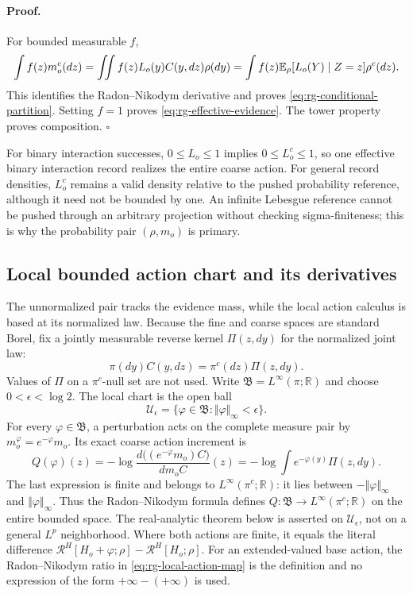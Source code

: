 \paragraph{Proof.}
For bounded measurable $f$,
\[
\int f(z)m_o^c(dz)
=\iint f(z)L_o(y)C(y,dz)\rho(dy)
=\int f(z)\mathbb E_\rho[L_o(Y)\mid Z=z]\rho^c(dz).
\]
This identifies the Radon--Nikodym derivative and proves
\eqref{eq:rg-conditional-partition}.  Setting $f=1$ proves
\eqref{eq:rg-effective-evidence}.  The tower property proves composition.
$\square$

For binary interaction successes, $0\leq L_o\leq1$ implies
$0\leq L_o^c\leq1$, so one effective binary interaction record realizes the
entire coarse action.  For general record densities, $L_o^c$ remains a valid
density relative to the pushed probability reference, although it need not be
bounded by one.  An infinite Lebesgue reference cannot be pushed through an
arbitrary projection without checking sigma-finiteness; this is why the
probability pair $(\rho,m_o)$ is primary.  

\subsection{Local bounded action chart and its derivatives}
\label{sec:rg-local-action-calculus}

The unnormalized pair tracks the evidence mass, while the local action
calculus is based at its normalized law.  Because the fine and coarse spaces
are standard Borel, fix a jointly measurable reverse kernel
\(\Pi(z,dy)\) for the normalized joint law:
\begin{equation}
\pi(dy)C(y,dz)=\pi^c(dz)\Pi(z,dy).
\label{eq:rg-normalized-reverse-kernel}
\end{equation}
Values of \(\Pi\) on a \(\pi^c\)-null set are not used.  Write
\(\mathfrak B=L^\infty(\pi;\mathbb R)\) and choose
\(0<\epsilon<\log 2\).  The local chart is the open ball
\begin{equation}
\mathcal U_\epsilon=
\{\varphi\in\mathfrak B:\Vert\varphi\Vert_\infty<\epsilon\}.
\label{eq:rg-bounded-action-chart}
\end{equation}
For every \(\varphi\in\mathfrak B\), a perturbation acts on the complete
measure pair by \(m_o^\varphi=e^{-\varphi}m_o\).  Its exact coarse action
increment is
\begin{equation}
Q(\varphi)(z)
=-\log\frac{d\bigl((e^{-\varphi}m_o)C\bigr)}{dm_oC}(z)
=-\log\int e^{-\varphi(y)}\Pi(z,dy).
\label{eq:rg-local-action-map}
\end{equation}
The last expression is finite and belongs to
\(L^\infty(\pi^c;\mathbb R)\): it lies between
\(-\Vert\varphi\Vert_\infty\) and
\(\Vert\varphi\Vert_\infty\).  Thus the Radon--Nikodym formula defines
\(Q:\mathfrak B\to L^\infty(\pi^c;\mathbb R)\) on the entire bounded
space.  The real-analytic theorem below is asserted on
\(\mathcal U_\epsilon\), not on a general \(L^p\) neighborhood.  Where both
actions are finite, it equals the literal
difference \(\mathcal R^H[H_o+\varphi;\rho]-
\mathcal R^H[H_o;\rho]\).  For an extended-valued base action, the
Radon--Nikodym ratio in \eqref{eq:rg-local-action-map} is the definition and
no expression of the form \(+\infty-(+\infty)\) is used. 

